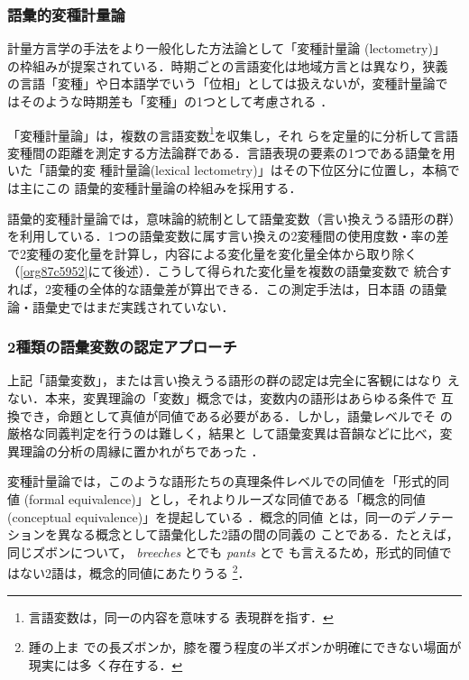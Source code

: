 \documentclass[submit]{ipsj}
\renewcommand{\ref}{\cref}
\begin{document}
\subsubsection{語彙的変種計量論\label{orgef323e7}}
\label{sec:org40f8c79}
計量方言学の手法をより一般化した方法論として「変種計量論 (lectometry)」
の枠組みが提案されている．時期ごとの言語変化は地域方言とは異なり，狭義
の言語「変種」や日本語学でいう「位相」としては扱えないが，変種計量論で
はそのような時期差も「変種」の1つとして考慮される
\cite{Geeraerts2023Lexical}．

「変種計量論」は，複数の言語変数\footnote{言語変数は，同一の内容を意味する
表現群を指す\cite[, 188]{Labov1972Sociolinguistic}．}を収集し，それ
らを定量的に分析して言語変種間の距離を測定する方法論群である\cite{Ruette2014Semantic}．言語表現の要素の1つである語彙を用いた「語彙的変
種計量論(lexical lectometry)」はその下位区分に位置し，本稿では主にこの
語彙的変種計量論の枠組みを採用する．

語彙的変種計量論では，意味論的統制として語彙変数（言い換えうる語形の群）
を利用している．1つの語彙変数に属す言い換えの2変種間の使用度数・率の差
で2変種の変化量を計算し，内容による変化量を変化量全体から取り除く
（\ref{org87c5952}にて後述）．こうして得られた変化量を複数の語彙変数で
統合すれば，2変種の全体的な語彙差が算出できる．この測定手法は，日本語
の語彙論・語彙史ではまだ実践されていない．
\subsubsection{2種類の語彙変数の認定アプローチ}
\label{sec:orgc8dfe01}
上記「語彙変数」，または言い換えうる語形の群の認定は完全に客観にはなり
えない．本来，変異理論の「変数」概念では，変数内の語形はあらゆる条件で
互換でき，命題として真値が同値である必要がある．しかし，語彙レベルでそ
の厳格な同義判定を行うのは難しく\cite{Lavandera1978Where}，結果と
して語彙変異は音韻などに比べ，変異理論の分析の周縁に置かれがちであった
\cite{DePascale2019Tokenbased}．

変種計量論では，このような語形たちの真理条件レベルでの同値を「形式的同
値 (formal equivalence)」とし，それよりルーズな同値である「概念的同値
(conceptual equivalence)」を提起している
\cite{Geeraerts2023Lexical,DePascale2019Tokenbased}．概念的同値
とは，同一のデノテーションを異なる概念として語彙化した2語の間の同義の
ことである．たとえば，同じズボンについて， \emph{breeches} とでも \emph{pants} とで
も言えるため，形式的同値ではない2語は，概念的同値にあたりうる
\cite{DePascale2019Tokenbased,Geeraerts2023Lexical}\footnote{踵の上ま
での長ズボンか，膝を覆う程度の半ズボンか明確にできない場面が現実には多
く存在する．}．
\end{document}
